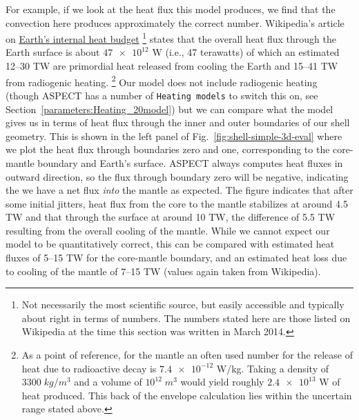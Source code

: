 \documentclass{article}
\newcommand{\aspect}{\textsc{ASPECT}}
\begin{document}
For example, if we look at the heat flux this model produces, we find that the
convection here produces approximately the correct number. Wikipedia's article
on \href{http://en.wikipedia.org/wiki/Earth's_internal_heat_budget}{Earth's
internal heat budget}%
\footnote{Not necessarily the most scientific source, but easily
accessible and typically about right in terms of numbers. The numbers stated
here are those listed on Wikipedia at the time this section was written in
March 2014.}
states that the overall heat flux through the Earth surface is about $\num{47e12}$ W (i.e., 47 terawatts) of which an estimated 12--30 TW are primordial
heat released from cooling the Earth and 15--41 TW from radiogenic heating.%
\footnote{As a point of reference, for the mantle an often used number for the
release of heat due to radioactive decay is $\num{7.4e-12}$ W/kg. Taking a
density of $3300\; \si{kg}/\si{m}^3$ and a volume of $10^{12}\; \si{m}^3$
would yield roughly $\num{2.4e13}$ W of heat produced. This back of the
envelope calculation lies within the uncertain range stated above.}
Our model does not include radiogenic heating (though \aspect{} has a number of
\texttt{Heating models} to switch this on, see
Section~\ref{parameters:Heating_20model}) but we can compare what the model
gives us in terms of heat flux through the inner and outer boundaries of our
shell geometry. This is shown in the left panel of
Fig.~\ref{fig:shell-simple-3d-eval} where we plot the heat flux through
boundaries zero and one, corresponding to the core-mantle boundary and Earth's
surface. \aspect{} always computes heat fluxes in outward direction, so the flux
through boundary zero will be negative, indicating the we have a net flux
\textit{into} the mantle as expected. The figure indicates that after some
initial jitters, heat flux from the core to the mantle stabilizes at around 4.5
TW and that through the surface at around 10 TW, the difference of 5.5 TW
resulting from the overall cooling of the mantle. While we cannot expect our model to be
quantitatively correct, this can be compared with estimated heat fluxes of 5--15
TW for the core-mantle boundary, and an estimated heat loss due to cooling of
the mantle of 7--15 TW (values again taken from Wikipedia).
\end{document}

